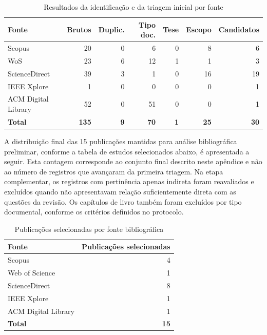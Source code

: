 \begin{table}[htbp]
\centering
\caption{Resultados da identificação e da triagem inicial por fonte}
\label{tab:triagem-por-fonte}
\scriptsize
\begin{tabular}{p{2.7cm}rrrrrr}
\hline
\textbf{Fonte} & \textbf{Brutos} & \textbf{Duplic.} & \textbf{Tipo doc.} & \textbf{Tese} & \textbf{Escopo} & \textbf{Candidatos} \\
\hline
Scopus & 20 & 0 & 6 & 0 & 8 & 6 \\
WoS & 23 & 6 & 12 & 1 & 1 & 3 \\
ScienceDirect & 39 & 3 & 1 & 0 & 16 & 19 \\
IEEE Xplore & 1 & 0 & 0 & 0 & 0 & 1 \\
ACM Digital Library & 52 & 0 & 51 & 0 & 0 & 1 \\
\textbf{Total} & \textbf{135} & \textbf{9} & \textbf{70} & \textbf{1} & \textbf{25} & \textbf{30} \\
\hline
\end{tabular}
\normalsize
{}
\end{table}

A distribuição final das 15 publicações mantidas para análise bibliográfica
preliminar, conforme a tabela de estudos selecionados abaixo, é apresentada a
seguir. Esta contagem corresponde ao conjunto final descrito neste apêndice e
não ao número de registros que avançaram da primeira triagem. Na etapa complementar, os registros com pertinência apenas indireta foram
reavaliados e excluídos quando não apresentavam relação suficientemente direta
com as questões da revisão. Os capítulos de livro também foram excluídos por
tipo documental, conforme os critérios definidos no protocolo.

\begin{table}[htbp]
\centering
\caption{Publicações selecionadas por fonte bibliográfica}
\label{tab:selecionados-por-fonte}
\small
\begin{tabular}{lr}
\hline
\textbf{Fonte} & \textbf{Publicações selecionadas} \\
\hline
Scopus & 4 \\
Web of Science & 1 \\
ScienceDirect & 8 \\
IEEE Xplore & 1 \\
ACM Digital Library & 1 \\
\hline
\textbf{Total} & \textbf{15} \\
\hline
\end{tabular}
\end{table}

